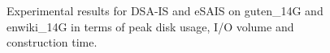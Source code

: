 \documentclass[10pt,journal,compsoc]{IEEEtran}
\begin{document}
\begin{figure}[htbp!]
	\centering
	\hfil
	\hfil
	\caption{Experimental results for DSA-IS and eSAIS on guten\_14G and enwiki\_14G in terms of peak disk usage, I/O volume and construction time.}
	\label{fig:performance_analysis1}
\end{figure}
\end{document}
